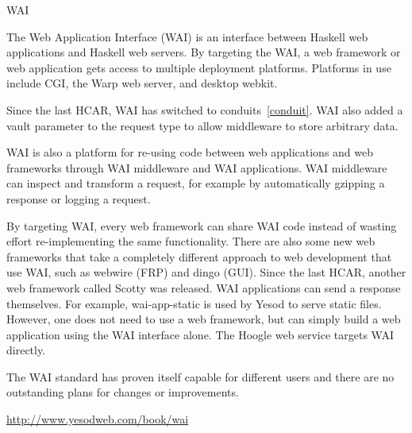 \begin{hcarentry}{WAI}
\label{wai}
\makeheader

The Web Application Interface (WAI) is an interface between Haskell web
applications and Haskell web servers. By targeting the WAI, a web framework or web application gets access to multiple deployment platforms. Platforms in use include CGI, the Warp web server, and desktop webkit.

Since the last HCAR, WAI has switched to conduits~\cref{conduit}. WAI also added a vault parameter to the request type to allow middleware to store arbitrary data.

WAI is also a platform for re-using code between web applications and web frameworks through WAI middleware and WAI applications. WAI middleware can inspect and transform a request, for example by automatically gzipping a response or logging a request.

By targeting WAI, every web framework can share WAI code instead of wasting effort re-implementing the same functionality. There are also some new web frameworks that take a completely different approach to web development that use WAI, such as webwire (FRP) and dingo (GUI). Since the last HCAR, another web framework called Scotty was released. WAI applications can send a response themselves. For example, wai-app-static is used by Yesod to serve static files. However, one does not need to use a web framework, but can simply build a web application using the WAI interface alone. The Hoogle %
web service targets WAI directly.

The WAI standard has proven itself capable for different users and there are no outstanding plans for changes or improvements.

\FurtherReading
\url{http://www.yesodweb.com/book/wai}
\end{hcarentry}
